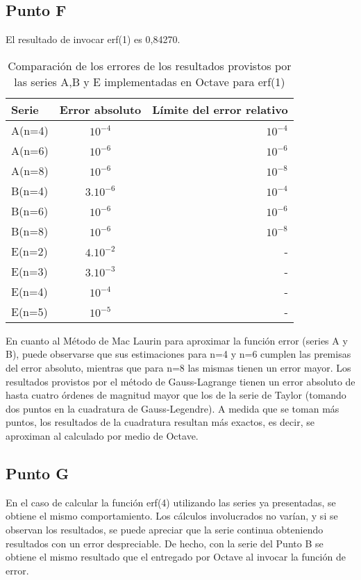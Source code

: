 \documentclass[a4paper]{article}
\begin{document}
\subsection{Punto F}
El resultado de invocar erf(1) es 0,84270.

\begin{table}[H]
\centering
\begin{tabular}{l c  r}
\hline
Serie & Error absoluto & Límite del error relativo \\ \hline
A(n=4) & $10^{-4}$ & $10^{-4}$ \\
A(n=6) & $10^{-6}$ & $10^{-6}$\\
A(n=8) & $10^{-6}$ & $10^{-8}$\\ \hline
B(n=4) & $3.10^{-6}$ & $10^{-4}$\\
B(n=6) & $10^{-6}$ & $10^{-6}$\\
B(n=8) & $10^{-6}$ & $10^{-8}$\\ \hline
E(n=2) & $4.10^{-2}$ & -\\
E(n=3) & $3.10^{-3}$ & -\\
E(n=4) & $10^{-4}$ & -\\
E(n=5) & $10^{-5}$ & -\\ \hline
\end{tabular}
\caption{Comparación de los errores de los resultados provistos por las series A,B y E implementadas en Octave para erf(1)}
\end{table}

En cuanto al Método de Mac Laurin para aproximar la función error (series A y B), puede observarse que sus estimaciones para n=4 y n=6 cumplen las premisas del error absoluto, mientras que para n=8 las mismas tienen un error mayor.
Los resultados provistos por el método de Gauss-Lagrange tienen un error absoluto de hasta cuatro órdenes de magnitud mayor que los de la serie de Taylor (tomando dos puntos en la cuadratura de Gauss-Legendre). A medida que se toman más puntos, los resultados de la cuadratura resultan más exactos, es decir, se aproximan al calculado por medio de Octave.


\subsection{Punto G}
En el caso de calcular la función erf(4) utilizando las series ya presentadas, se obtiene el mismo comportamiento. Los cálculos involucrados no varían, y si se observan los resultados, se puede apreciar que la serie continua obteniendo resultados con un error despreciable. De hecho, con la serie del Punto B se obtiene el mismo resultado que el entregado por Octave al invocar la función de error.
\end{document}
